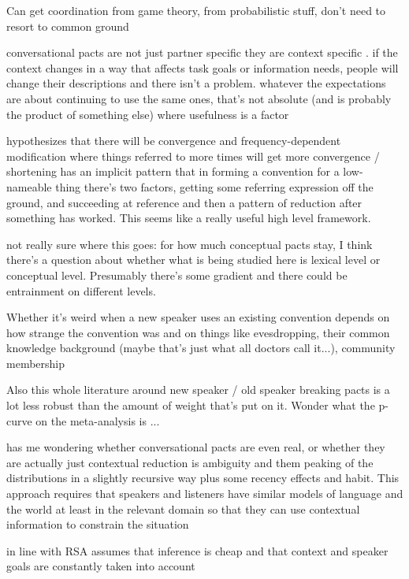 \documentclass[]{article}
\begin{document}
Can get coordination from game theory, from probabilistic stuff, don't need to resort to common ground

conversational pacts are not just partner specific they are context specific \cite{ibarra2016}. if the context changes in a way that affects task goals or information needs, people will change their descriptions and there isn't a problem. whatever the expectations are about continuing to use the same ones, that's not absolute (and is probably the product of something else) where usefulness is a factor 

\cite{krauss1964} hypothesizes that there will be convergence and frequency-dependent modification where things referred to more times will get more convergence / shortening
 \cite{leung2023} has an implicit pattern that in forming a convention for a low-nameable thing there's two factors, getting some referring expression off the ground, and succeeding at reference and then a pattern of reduction after something has worked. This seems like a really useful high level framework. 
 
 not really sure where this goes: \cite{metzing2003a} for how much conceptual pacts stay, I think there's a question about whether what is being studied here is lexical level or conceptual level. Presumably there's some gradient and there could be entrainment on different levels. 
 
 Whether it's weird when a new speaker uses an existing convention depends on how strange the convention was and on things like evesdropping, their common knowledge background (maybe that's just what all doctors call it...), community membership
 
 Also this whole literature around new speaker / old speaker breaking pacts is a lot less robust than the amount of weight that's put on it. Wonder what the p-curve on the meta-analysis is ... 
 
 \cite{piantadosi2012} has me wondering whether conversational pacts are even real, or whether they are actually just contextual reduction is ambiguity and them peaking of the distributions in a slightly recursive way plus some recency effects and habit. This approach requires that speakers and listeners have similar models of language and the world at least in the relevant domain so that they can use contextual information to constrain the situation 
 
 \cite{piantadosi2012} in line with RSA assumes that inference is cheap and that context and speaker goals are constantly taken into account 
\end{document}
